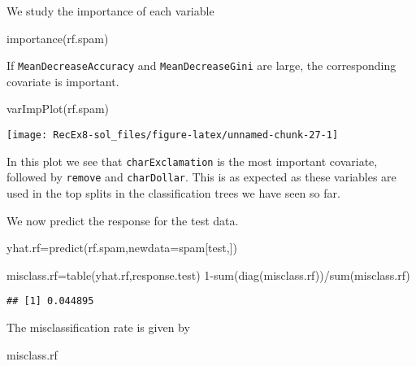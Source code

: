 \documentclass[
]{article}
\newenvironment{Shaded}{\begin{snugshade}}{\end{snugshade}}
\newcommand{\AttributeTok}[1]{\textcolor[rgb]{0.77,0.63,0.00}{#1}}
\newcommand{\DecValTok}[1]{\textcolor[rgb]{0.00,0.00,0.81}{#1}}
\newcommand{\FunctionTok}[1]{\textcolor[rgb]{0.00,0.00,0.00}{#1}}
\newcommand{\NormalTok}[1]{#1}
\newcommand{\OtherTok}[1]{\textcolor[rgb]{0.56,0.35,0.01}{#1}}
\newcommand{\SpecialCharTok}[1]{\textcolor[rgb]{0.00,0.00,0.00}{#1}}
\begin{document}
We study the importance of each variable

\begin{Shaded}
\begin{Highlighting}[]
\FunctionTok{importance}\NormalTok{(rf.spam)}
\end{Highlighting}
\end{Shaded}

If \texttt{MeanDecreaseAccuracy} and \texttt{MeanDecreaseGini} are
large, the corresponding covariate is important.

\begin{Shaded}
\begin{Highlighting}[]
\FunctionTok{varImpPlot}\NormalTok{(rf.spam)}
\end{Highlighting}
\end{Shaded}

\texttt{[image: RecEx8-sol\_files/figure-latex/unnamed-chunk-27-1]}

In this plot we see that \texttt{charExclamation} is the most important
covariate, followed by \texttt{remove} and \texttt{charDollar}. This is
as expected as these variables are used in the top splits in the
classification trees we have seen so far.

We now predict the response for the test data.

\begin{Shaded}
\begin{Highlighting}[]
\NormalTok{yhat.rf}\OtherTok{=}\FunctionTok{predict}\NormalTok{(rf.spam,}\AttributeTok{newdata=}\NormalTok{spam[test,])}

\NormalTok{misclass.rf}\OtherTok{=}\FunctionTok{table}\NormalTok{(yhat.rf,response.test)}
\DecValTok{1}\SpecialCharTok{{-}}\FunctionTok{sum}\NormalTok{(}\FunctionTok{diag}\NormalTok{(misclass.rf))}\SpecialCharTok{/}\FunctionTok{sum}\NormalTok{(misclass.rf)}
\end{Highlighting}
\end{Shaded}

\begin{verbatim}
## [1] 0.044895
\end{verbatim}

The misclassification rate is given by

\begin{Shaded}
\begin{Highlighting}[]
\NormalTok{misclass.rf}
\end{Highlighting}
\end{Shaded}
\end{document}
